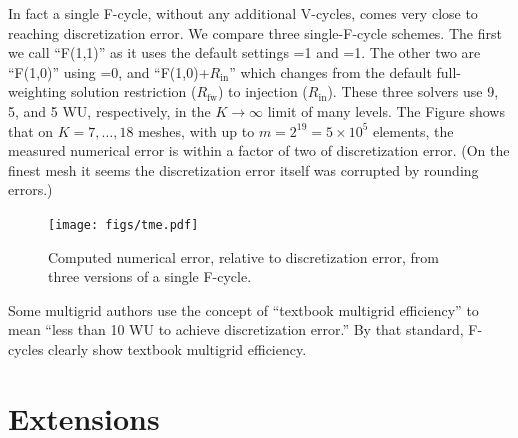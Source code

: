 \documentclass[letterpaper,final,12pt,reqno]{amsart}
\newcommand{\Rin}{R_{\text{in}}}
\newcommand{\Rfw}{R_{\text{fw}}}
\begin{document}
In fact a single F-cycle, without any additional V-cycles, comes very close to reaching discretization error.  We compare three single-F-cycle schemes.  The first we call ``F(1,1)'' as it uses the default settings =1 and =1.  The other two are ``F(1,0)'' using =0, and ``F(1,0)+$\Rin$'' which changes from the default full-weighting solution restriction ($\Rfw$) to injection ($\Rin$).  These three solvers use 9, 5, and 5 WU, respectively, in the $K\to\infty$ limit of many levels.  The Figure shows that on $K=7,\dots,18$ meshes, with up to $m=2^{19} = 5 \times 10^5$ elements, the measured numerical error is within a factor of two of discretization error.  (On the finest mesh it seems the discretization error itself was corrupted by rounding errors.)

\begin{figure}
\texttt{[image: figs/tme.pdf]}
\caption{Computed numerical error, relative to discretization error, from three versions of a single F-cycle.}
\label{fig:tme}
\end{figure}

Some multigrid authors \cite[for example]{BrownSmithAhmadia2013} use the concept of ``textbook multigrid efficiency'' to mean ``less than 10 WU to achieve discretization error.''  By that standard, F-cycles clearly show textbook multigrid efficiency.


\section{Extensions}  \label{sec:extensions}
\end{document}
